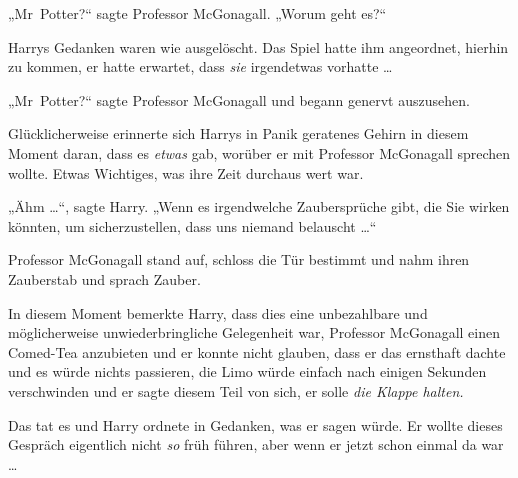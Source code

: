 „Mr~Potter?“ sagte Professor McGonagall.
„Worum geht es?“

Harrys Gedanken waren wie ausgelöscht. Das Spiel hatte ihm angeordnet, hierhin zu kommen, er hatte erwartet, dass \emph{sie} irgendetwas vorhatte …

„Mr~Potter?“ sagte Professor McGonagall und begann genervt auszusehen.

Glücklicherweise erinnerte sich Harrys in Panik geratenes Gehirn in diesem Moment daran, dass es \emph{etwas} gab, worüber er mit Professor McGonagall sprechen wollte. Etwas Wichtiges, was ihre Zeit durchaus wert war.

„Ähm …“, sagte Harry.
„Wenn es irgendwelche Zaubersprüche gibt, die Sie wirken könnten, um sicherzustellen, dass uns niemand belauscht …“

Professor McGonagall stand auf, schloss die Tür bestimmt und nahm ihren Zauberstab und sprach Zauber.

In diesem Moment bemerkte Harry, dass dies eine unbezahlbare und möglicherweise unwiederbringliche Gelegenheit war, Professor McGonagall einen Comed-Tea anzubieten und er konnte nicht glauben, dass er das ernsthaft dachte und es würde nichts passieren, die Limo würde einfach nach einigen Sekunden verschwinden und er sagte diesem Teil von sich, er solle \emph{die Klappe halten.}

Das tat es und Harry ordnete in Gedanken, was er sagen würde. Er wollte dieses Gespräch eigentlich nicht \emph{so} früh führen, aber wenn er jetzt schon einmal da war …

